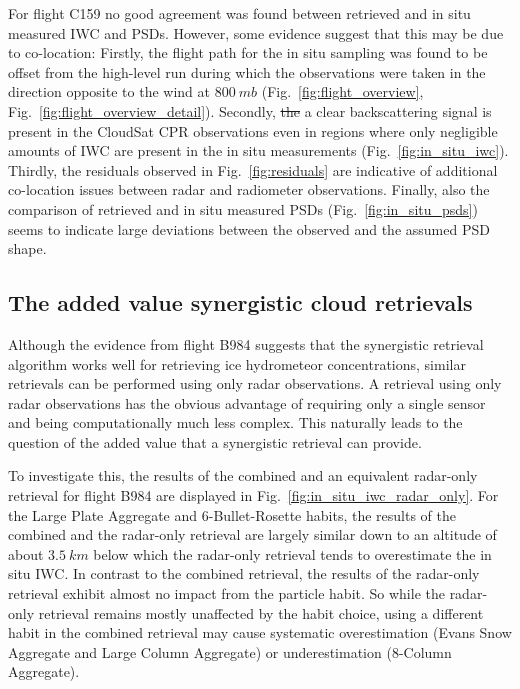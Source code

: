 \documentclass[journal abbreviation, manuscript]{copernicus}
\providecommand{\DIFdel}[1]{{\protect\color{red}\sout{#1}}}                      %
\providecommand{\DIFdelbegin}{} %
\providecommand{\DIFdelend}{} %
\begin{document}
For flight C159 no good agreement was found between retrieved and in situ
measured IWC and PSDs. However, some evidence suggest that this may be due to
co-location: Firstly, the flight path for the in situ sampling was found to be
offset from the high-level run during which the observations were taken in the
direction opposite to the wind at $800\ \unit{mb}$
(Fig.~\ref{fig:flight_overview}, Fig.~\ref{fig:flight_overview_detail}).
Secondly, \DIFdelbegin \DIFdel{the }\DIFdelend a clear backscattering signal is present in the CloudSat CPR
observations even in regions where only negligible amounts of IWC are present in
the in situ measurements (Fig.~\ref{fig:in_situ_iwc}). Thirdly, the residuals
observed in Fig.~\ref{fig:residuals} are indicative of additional co-location
issues between radar and radiometer observations. Finally, also the
comparison of retrieved and in situ measured PSDs (Fig.~\ref{fig:in_situ_psds})
seems to indicate large deviations between the observed and the assumed PSD
shape.

\subsection{The added value synergistic cloud retrievals}

Although the evidence from flight B984 suggests that the synergistic
retrieval algorithm works well for retrieving ice hydrometeor concentrations,
similar retrievals can be performed using only radar observations. A retrieval
using only radar observations has the obvious advantage of requiring only
a single sensor and being computationally much less complex. This naturally
leads to the question of the added value that a synergistic retrieval
can provide.

To investigate this, the results of the combined and an equivalent radar-only
retrieval for flight B984 are displayed in
Fig.~\ref{fig:in_situ_iwc_radar_only}. For the Large Plate Aggregate and
6-Bullet-Rosette habits, the results of the combined and the radar-only
retrieval are largely similar down to an altitude of about $3.5\ \unit{km}$
below which the radar-only retrieval tends to overestimate the in situ IWC. In
contrast to the combined retrieval, the results of the radar-only retrieval
exhibit almost no impact from the particle habit. So while the radar-only
retrieval remains mostly unaffected by the habit choice, using a different habit
in the combined retrieval may cause systematic overestimation (Evans Snow
Aggregate and Large Column Aggregate) or underestimation (8-Column Aggregate).
\end{document}
